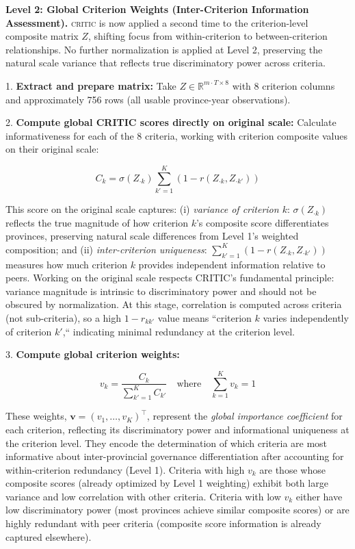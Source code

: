 \documentclass[12pt,a4paper]{article}
\newcommand{\CRITIC}{\textsc{critic}\xspace}
\begin{document}
\textbf{Level 2: Global Criterion Weights (Inter-Criterion Information Assessment).} \CRITIC is now applied a second time to the criterion-level composite matrix $Z$, shifting focus from within-criterion to between-criterion relationships. No further normalization is applied at Level 2, preserving the natural scale variance that reflects true discriminatory power across criteria.

1. \textbf{Extract and prepare matrix:} Take $Z \in \mathbb{R}^{m \cdot T \times 8}$ with 8 criterion columns and approximately 756 rows (all usable province-year observations).

2. \textbf{Compute global CRITIC scores directly on original scale:} Calculate informativeness for each of the 8 criteria, working with criterion composite values on their original scale:

\begin{equation}
\label{eq:critic_level2}
C_k = \sigma(Z_{\cdot k}) \sum_{k'=1}^{K} \left(1 - r(Z_{\cdot k}, Z_{\cdot k'})\right)
\end{equation}

This score on the original scale captures: (i) \emph{variance of criterion $k$}: $\sigma(Z_{\cdot k})$ reflects the true magnitude of how criterion $k$'s composite score differentiates provinces, preserving natural scale differences from Level 1's weighted composition; and (ii) \emph{inter-criterion uniqueness}: $\sum_{k'=1}^{K} (1 - r(Z_{\cdot k}, Z_{\cdot k'}))$ measures how much criterion $k$ provides independent information relative to peers. Working on the original scale respects CRITIC's fundamental principle: variance magnitude is intrinsic to discriminatory power and should not be obscured by normalization. At this stage, correlation is computed across criteria (not sub-criteria), so a high $1 - r_{kk'}$ value means ``criterion $k$ varies independently of criterion $k'$,`` indicating minimal redundancy at the criterion level.

3. \textbf{Compute global criterion weights:}

\begin{equation}
\label{eq:weights_level2}
v_k = \frac{C_k}{\sum_{k'=1}^{K} C_{k'}} \quad \text{where} \quad \sum_{k=1}^{K} v_k = 1
\end{equation}

These weights, $\mathbf{v} = (v_1, \ldots, v_K)^\top$, represent the \emph{global importance coefficient} for each criterion, reflecting its discriminatory power and informational uniqueness at the criterion level. They encode the determination of which criteria are most informative about inter-provincial governance differentiation after accounting for within-criterion redundancy (Level 1). Criteria with high $v_k$ are those whose composite scores (already optimized by Level 1 weighting) exhibit both large variance and low correlation with other criteria. Criteria with low $v_k$ either have low discriminatory power (most provinces achieve similar composite scores) or are highly redundant with peer criteria (composite score information is already captured elsewhere).
\end{document}
